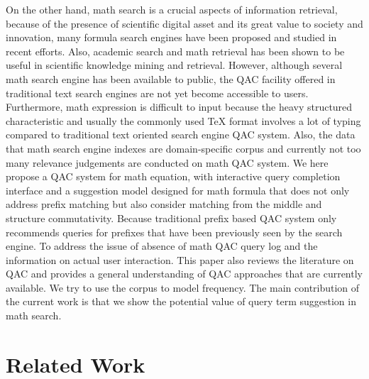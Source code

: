 \documentclass[12pt]{article} %
\begin{document}
On the other hand, math search is a crucial aspects of information retrieval, because of the presence of scientific digital asset and its great value to society and innovation, many formula search engines have been proposed and studied in recent efforts.
Also, academic search and math retrieval has been shown to be useful in scientific knowledge mining and retrieval.
However, although several math search engine has been available to public, the QAC facility offered in traditional text search engines are not yet become accessible to users.
Furthermore, math expression is difficult to input because the heavy structured characteristic and 
usually the commonly used TeX format involves a lot of typing compared to traditional text oriented search engine QAC system.
Also, the data that math search engine indexes are domain-specific corpus and currently not too many relevance judgements are conducted on math QAC system.
We here propose a QAC system for math equation,
with interactive query completion interface and a suggestion model designed for math formula that does not only address prefix matching but also consider matching from the middle and structure commutativity. Because traditional prefix based QAC system only recommends queries for prefixes that have been previously seen by the search engine.
To address the issue of absence of math QAC query log and the information on actual user interaction.
This paper also reviews the literature on QAC and provides a general understanding of QAC approaches that are currently available.
We try to use the corpus to model frequency.
The main contribution of the current work is that we show the potential value of query
term suggestion in math search.

\section{Related Work}
\end{document}
